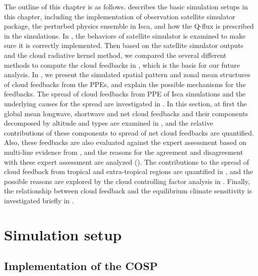 
The outline of this chapter is as follows.  describes the basic simulation setups in this chapter, including the implementation of observation satellite simulator package, the perturbed physics ensemble in Isca, and how the Q-flux is prescribed in the simulations. In , the behaviors of satellite simulator is examined to make sure it is correctly implemented. Then based on the satellite simulator outputs and the cloud radiative kernel method, we compared the several different methods to compute the cloud feedbacks in , which is the basis for our future analysis. In , we present the simulated spatial pattern and zonal mean structures of cloud feedbacks from the PPEs, and explain the possible mechanisms for the feedbacks. The spread of cloud feedbacks from PPE of Isca simulations and the underlying causes for the spread are investigated in . In this section, at first the global mean longwave, shortwave and net cloud feedbacks and their components decomposed by altitude and types are examined in , and the relative contributions of these components to spread of net cloud feedbacks are quantified. Also, these feedbacks are also evaluated against the expert assessment based on multi-line evidence from \cite{Sherwood2020}, and the reasons for the agreement and disagreement with these expert assessment are analyzed (). The contributions to the spread of cloud feedback from tropical and extra-tropical regions are quantified in , and the possible reasons are explored by the cloud controlling factor analysis in . Finally, the relationship between cloud feedback and the equilibrium climate sensitivity is investigated briefly in .


\section{Simulation setup}
\label{sec:simulation_setup_cld_fbk}

\subsection{Implementation of the COSP}
\label{sec:implementation_of_cosp}

